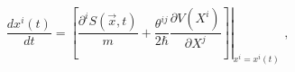 \begin{equation}
\frac{dx^{i}(t)}{dt}=\left.  \left[  \frac{\partial^{i}S(\vec{x},t)}{m}%
+\frac{\theta^{ij}}{2\hbar}\frac{\partial V(X^{i})}{\partial X^{j}}\right]
\right|  _{x^{i}=x^{i}(t)}\text{ \ ,}\label{30}%
\end{equation}

